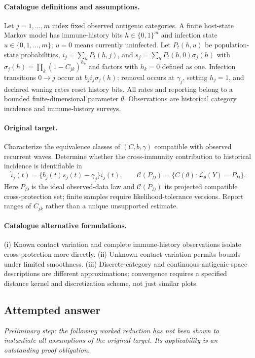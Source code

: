 \documentclass[11pt]{article}
\begin{document}
\paragraph{Catalogue definitions and assumptions.}
Let $j=1,\ldots,m$ index fixed observed antigenic categories. A finite host-state Markov model has immune-history bits $h\in\{0,1\}^m$ and infection state $u\in\{0,1,\ldots,m\}$; $u=0$ means currently uninfected. Let $P_t(h,u)$ be population-state probabilities, $i_j=\sum_hP_t(h,j)$, and $s_j=\sum_hP_t(h,0)\sigma_j(h)$ with $\sigma_j(h)=\prod_k(1-C_{jk})^{h_k}$ and factors with $h_k=0$ defined as one. Infection transitions $0\to j$ occur at $b_ji_j\sigma_j(h)$; removal occurs at $\gamma_j$, setting $h_j=1$, and declared waning rates reset history bits. All rates and reporting belong to a bounded finite-dimensional parameter $\theta$. Observations are historical category incidence and immune-history surveys.
\paragraph{Original target.}
Characterize the equivalence classes of $(C,b,\gamma)$ compatible with observed recurrent waves. Determine whether the cross-immunity contribution to historical incidence is identifiable in
    \[\dot i_j(t)=\{b_j(t)s_j(t)-\gamma_j\}i_j(t),\qquad
    \mathcal C(P_D)=\{C(\theta):\mathcal L_\theta(Y)=P_D\}.
    \]
    Here $P_D$ is the ideal observed-data law and $\mathcal C(P_D)$ its projected compatible cross-protection set; finite samples require likelihood-tolerance versions. Report ranges of $C_{jk}$ rather than a unique unsupported estimate.
\paragraph{Catalogue alternative formulations.}
(i) Known contact variation and complete immune-history observations isolate cross-protection more directly. (ii) Unknown contact variation permits bounds under limited smoothness. (iii) Discrete-category and continuous-antigenic-space descriptions are different approximations; convergence requires a specified distance kernel and discretization scheme, not just similar plots.
\subsection{Attempted answer}
\noindent\emph{Preliminary step: the following worked reduction has not been shown to instantiate all assumptions of the original target. Its applicability is an outstanding proof obligation.}
\end{document}
